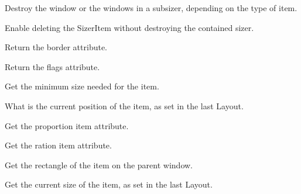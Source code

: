 Destroy the window or the windows in a subsizer, depending on the type
of item.


\label{wxsizeritemdetachsizer}


Enable deleting the SizerItem without destroying the contained sizer.


\label{wxsizeritemgetborder}


Return the border attribute.

\label{wxsizeritemgetflag}


Return the flags attribute.


\label{wxsizeritemgetminsize}


Get the minimum size needed for the item.

\label{wxsizeritemgetposition}


What is the current position of the item, as set in the last Layout.

\label{wxsizeritemgetproportion}


Get the proportion item attribute.

\label{wxsizeritemgetratio}


Get the ration item attribute.

\label{wxsizeritemgetrect}


Get the rectangle of the item on the parent window.

\label{wxsizeritemgetsize}


Get the current size of the item, as set in the last Layout.

\label{wxsizeritemgetsizer}

